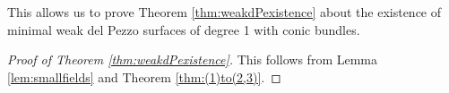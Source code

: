 \documentclass[a4paper, 11pt, reqno]{amsart}
\numberwithin{equation}{section} \numberwithin{figure}{section}
\theoremstyle{definition}
\numberwithin{lemma}{section}
\begin{document}

This allows us to prove Theorem \ref{thm:weakdPexistence} about the existence of minimal weak del Pezzo surfaces of degree 1 with conic bundles. 

\begin{proof}[Proof of Theorem \ref{thm:weakdPexistence}]
    This follows from Lemma \ref{lem:smallfields} and Theorem \ref{thm:(1)to(2,3)}.
\end{proof}
\end{document}
